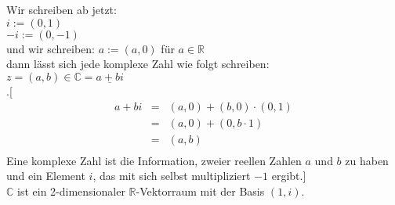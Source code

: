 Wir schreiben ab jetzt:\\
$i:=(0,1)$\\
$-i:=(0,-1)$\\
und wir schreiben: $a:=(a,0)$ für $a\in\mathbb{R}$\\
dann lässt sich jede komplexe Zahl wie folgt schreiben:\\
$z=(a,b)\in\mathbb{C}=\underline{a+bi}$\\
.[ 
\begin{eqnarray*}
a+bi &=& (a,0)+(b,0)\cdot(0,1)\\
&=& (a,0)+(0,b\cdot1)\\
&=& (a,b)\\
\end{eqnarray*}
Eine komplexe Zahl ist die Information, zweier reellen Zahlen $a$ und $b$ zu haben und ein Element $i$, das mit sich selbst multipliziert $-1$ ergibt.]\\
$\mathbb{C}$ ist ein 2-dimensionaler $\mathbb{R}$-Vektorraum mit der Basis $(1,i)$.